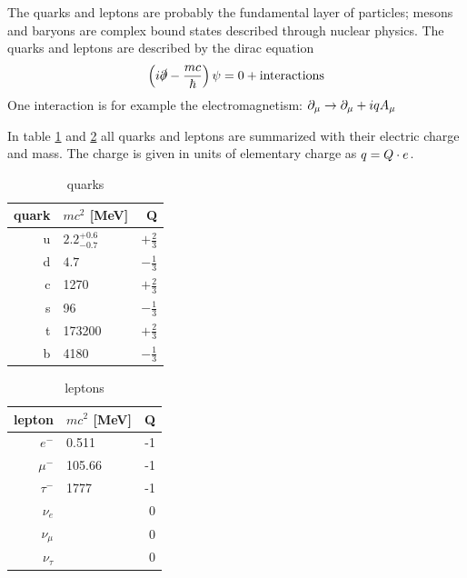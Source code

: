 The quarks and leptons are probably the fundamental layer of particles; mesons and baryons are complex bound states described through nuclear physics. The quarks and leptons are described by the dirac equation
\[ \left( i \dslash - \frac{mc}{\hbar} \right)\psi = 0 + \si{interactions}\]
One interaction is for example the electromagnetism: $\p_\mu \df \p_\mu + iq A_\mu$

In table \ref{quarks} and \ref{leptons} all quarks and leptons are summarized with their electric charge and mass. The charge is given in units of elementary charge as $q = Q\cc e$.\\
\begin{minipage}{80mm}
\begin{table}[H]
\centering
\begin{tabular}{r|lr}
quark & $mc^2$ [MeV] & Q \\
\midrule
u & $2.2^{+0.6}_{-0.7}$ & $+\frac{2}{3}$\\
d & $4.7$ & $-\frac{1}{3}$\\
\midrule
c & 1270 & $+\frac{2}{3}$\\
s & 96 & $-\frac{1}{3}$\\
\midrule
t & 173200 & $+\frac{2}{3}$\\
b & 4180 & $-\frac{1}{3}$\\
\bottomrule
\end{tabular}
\caption{quarks}
\label{quarks}
\end{table}
\end{minipage}
\begin{minipage}{80mm}
\begin{table}[H]
\centering
\begin{tabular}{r|lr}
lepton & $mc^2$ [MeV] & Q\\
\midrule
$e^-$ & 0.511 & -1\\
$\mu^-$ & 105.66 & -1 \\
$\tau^-$ & 1777 & -1 \\
\midrule
$\nu_e$ & & 0\\
$\nu_\mu$ & & 0\\
$\nu_\tau$ & &0\\
\bottomrule
\end{tabular}
\caption{leptons}
\label{leptons}
\end{table}
\end{minipage}


